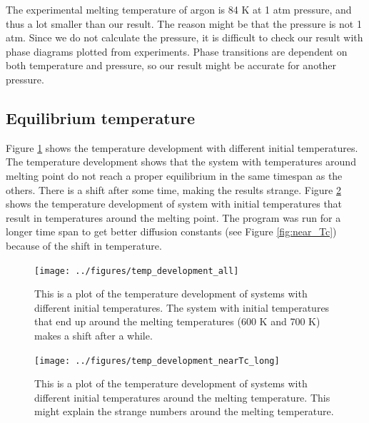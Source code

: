 The experimental melting temperature of argon is 84 K at 1 atm pressure, and thus a lot smaller than our result. The reason might be that the pressure is not 1 atm. Since we do not calculate the pressure, it is difficult to check our result with phase diagrams plotted from experiments. Phase transitions are dependent on both temperature and pressure, so our result might be accurate for another pressure.

\subsection{Equilibrium temperature}

Figure \ref{fig:temp_development_all} shows the temperature development with different initial temperatures. The temperature development shows that the system with temperatures around melting point do not reach a proper equilibrium in the same timespan as the others. There is a shift after some time, making the results strange. Figure \ref{fig:temp_development_nearTc} shows the temperature development of system with initial temperatures that result in temperatures around the melting point. The program was run for a longer time span to get better diffusion constants (see Figure \ref{fig:near_Tc}) because of the shift in temperature.

\begin{figure}[H]
\center
\texttt{[image: ../figures/temp\_development\_all]}\caption{This is a plot of the temperature development of systems with different initial temperatures. The system with initial temperatures that end up around the melting temperatures (600 K and 700 K) makes a shift after a while.}\label{fig:temp_development_all}
\end{figure}

\begin{figure}[H]
\center
\texttt{[image: ../figures/temp\_development\_nearTc\_long]}\caption{This is a plot of the temperature development of systems with different initial temperatures around the melting temperature. This might explain the strange numbers around the melting temperature.}\label{fig:temp_development_nearTc}
\end{figure}

